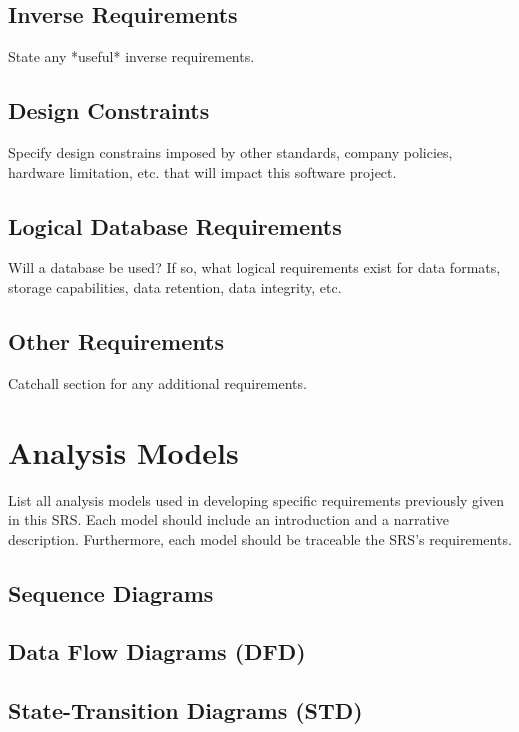 \documentclass{scrreprt}
\begin{document}
    \section{Inverse Requirements}

State any *useful* inverse requirements.

  \section{Design Constraints}

Specify design constrains imposed by other standards, company policies, hardware limitation, etc. that will impact this software project.

  \section{Logical Database Requirements}

Will a database be used?  If so, what logical requirements exist for data formats, storage capabilities, data retention, data integrity, etc.

  \section{Other Requirements}

Catchall section for any additional requirements.

\chapter{Analysis Models}

List all analysis models used in developing specific requirements previously given in this SRS.  Each model should include an introduction and a narrative description.  Furthermore, each model should be traceable the SRS’s requirements.

  \section{Sequence Diagrams}

  \section{Data Flow Diagrams (DFD)}

  \section{State-Transition Diagrams (STD)}
\end{document}
